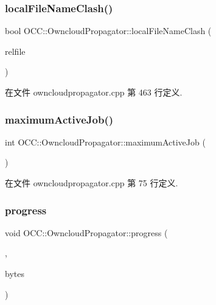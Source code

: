 \subsubsection{\texorpdfstring{local\+File\+Name\+Clash()}{localFileNameClash()}}
{\footnotesize\ttfamily bool O\+C\+C\+::\+Owncloud\+Propagator\+::local\+File\+Name\+Clash (\begin{DoxyParamCaption}\item[{const Q\+String \&}]{relfile }\end{DoxyParamCaption})}



在文件 owncloudpropagator.\+cpp 第 463 行定义.

\mbox{\label{class_o_c_c_1_1_owncloud_propagator_af29504f51670252ebe0b6d5890e48378}} 
\subsubsection{\texorpdfstring{maximum\+Active\+Job()}{maximumActiveJob()}}
{\footnotesize\ttfamily int O\+C\+C\+::\+Owncloud\+Propagator\+::maximum\+Active\+Job (\begin{DoxyParamCaption}{ }\end{DoxyParamCaption})}



在文件 owncloudpropagator.\+cpp 第 75 行定义.

\mbox{\label{class_o_c_c_1_1_owncloud_propagator_aa83ba6b612d6f37e9be97cd03805f1b4}} 
\subsubsection{\texorpdfstring{progress}{progress}}
{\footnotesize\ttfamily void O\+C\+C\+::\+Owncloud\+Propagator\+::progress (\begin{DoxyParamCaption}\item[{const \hyperlink{class_o_c_c_1_1_sync_file_item}{Sync\+File\+Item} \&}]{,  }\item[{quint64}]{bytes }\end{DoxyParamCaption})\hspace{0.3cm}{\ttfamily [signal]}}

